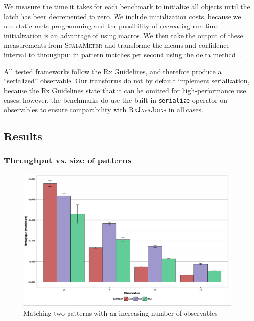 \documentclass[runningheads]{llncs}
\begin{document}
\begin{sloppypar}
We measure the time it takes for each benchmark to initialize all objects
until the latch has been decremented to zero. We include initialization costs,
because we use static meta-programming and the possibility of decreasing
run-time initialization is an advantage of using macros. We then take the output
of these measurements from \textsc{ScalaMeter} and transforme the means and
confidence interval to throughput in pattern matches per second using the
delta method~\cite{Casella:2002}.

All tested frameworks follow the Rx Guidelines, and therefore produce a
``serialized'' observable. Our transforms do not by default implement
serialization, because the Rx Guidelines state that it can be omitted for
high-performance use cases; however, the benchmarks do use the built-in
\texttt{serialize} operator on observables to ensure comparability with
\textsc{RxJavaJoins} in all cases.

\subsection{Results}

\captionsetup[figure]{labelsep=space}


\subsubsection{Throughput vs. size of patterns}

\begin{figure}[h]
  \centering
  \includegraphics[scale=0.30]{img/two-patterns-N-observables.pdf}
  \caption{Matching two patterns with an increasing number of observables}
  \label{fig:TwoChoiceNObservables}
\end{figure}


\end{sloppypar}
\end{document}
